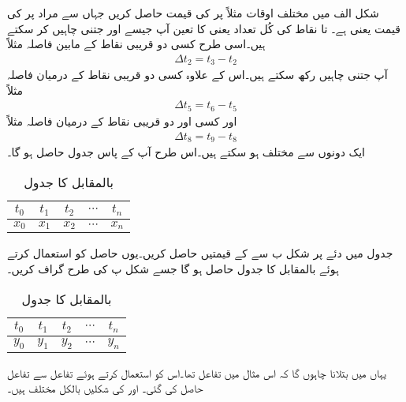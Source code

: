 شکل   الف میں مختلف اوقات مثلاً   پر  کی قیمت حاصل کریں جہاں   سے مراد  پر  کی قیمت یعنی  ہے۔ تا  نقاط کی کُل تعداد  یعنی   کا تعین آپ جیسے اور جتنی چاہیں کر سکتے ہیں۔اسی طرح کسی دو قریبی نقاط کے مابین فاصلہ مثلاً
\begin{align*}
\Delta t_2=t_3 -t_2
\end{align*}
آپ جتنی چاہیں رکھ سکتے ہیں۔اس کے علاوہ کسی دو قریبی نقاط کے درمیان فاصلہ مثلاً 
\begin{align*}
\Delta t_5=t_6-t_5
\end{align*}
اور کسی اور دو قریبی نقاط کے درمیان فاصلہ  مثلاً
\begin{align*}
\Delta t_8=t_9-t_8
\end{align*}
ایک دونوں سے مختلف ہو سکتے ہیں۔اس طرح آپ کے پاس جدول  حاصل ہو گا۔
\begin{table} [h]
\caption{ بالمقابل   کا جدول}
\label{جدول_ایکس_بالمقابل_ٹی}
\centering
\begin{LTR}
\begin{tabular}{c c c c c }
$ t_0 $ & $ t_1 $ & $ t_2 $ & $\cdots$ & $ t_n $ \\
\midrule
$ x_0 $ & $ x_1 $ & $ x_2 $ & $\cdots$ & $ x_n $ \\
\end{tabular}
\end{LTR}
\end{table}

جدول  میں دئے  پر شکل  ب سے  کے قیمتیں حاصل کریں۔یوں حاصل   کو استعمال کرتے ہوئے  بالمقابل  کا جدول  حاصل ہو گا جسے شکل  پ کی طرح گراف کریں۔

\begin{table} [h]
\caption{ بالمقابل   کا جدول}
\label{جدول_وائے_بالمقابل_ٹی}
\centering
\begin{LTR}
\begin{tabular}{c c c c c }
$ t_0 $ & $ t_1 $ & $ t_2 $ & $\cdots$ & $ t_n $ \\
\midrule
$ y_0 $ & $ y_1 $ & $ y_2 $ & $\cdots$ & $ y_n $ \\
\end{tabular}
\end{LTR}
\end{table}
یہاں میں بتلانا چاہوں گا کہ اس مثال میں تفاعل    تھا۔اس کو استعمال کرتے ہوئے تفاعل  سے تفاعل  حاصل کی گئی۔  اور  کی شکلیں بالکل مختلف ہیں۔

